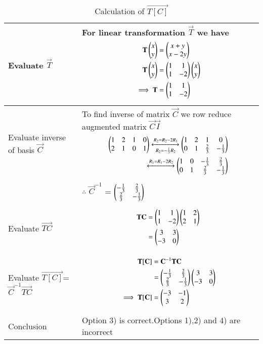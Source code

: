 \documentclass[journal,12pt,twocolumn]{IEEEtran}
\begin{document}
\begin{table}[h!]
\begin{center}
\begin{tabular}{|m{2.2cm}|m{6.3cm}|}\hline
        Evaluate $\vec{T}$ & For linear transformation $\vec{T}$ we have {\begin{align*}
            \mathbf{T}\begin{pmatrix}x\\y\end{pmatrix} &= \begin{pmatrix}x+y\\x-2y\end{pmatrix}\\
            \mathbf{T}\begin{pmatrix}x\\y\end{pmatrix} &= \begin{pmatrix}1&1\\1&-2\end{pmatrix}\begin{pmatrix}x\\y\end{pmatrix}\\
            \implies\mathbf{T} &= \begin{pmatrix}1&1\\1&-2\end{pmatrix}
        \end{align*}} \\
        \hline
        Evaluate inverse of basis $\vec{C}$ & To find inverse of matrix $\vec{C}$ we row reduce augmented matrix $\vec{C}$$\vec{I}$ {\begin{align*}
            \begin{pmatrix}1&2&1&0\\2&1&0&1\end{pmatrix}\xleftrightarrow[R_2=-\frac{1}{3}R_2]{R_2=R_2-2R_1}\begin{pmatrix}1&2&1&0\\0&1&\frac{2}{3}&-\frac{1}{3}\end{pmatrix}\\
            \xleftrightarrow{R_1=R_1-2R_2}\begin{pmatrix}1&0&-\frac{1}{3}&\frac{2}{3}\\0&1&\frac{2}{3}&-\frac{1}{3}\end{pmatrix}
        \end{align*}}\\
        &$\therefore$ $\vec{C}^{-1}$ = $\begin{pmatrix}-\frac{1}{3}&\frac{2}{3}\\\frac{2}{3}&-\frac{1}{3}\end{pmatrix}$ \\
        \hline
        Evaluate $\vec{TC}$ & {\begin{align*}
            \mathbf{TC} &= \begin{pmatrix}1&1\\1&-2\end{pmatrix}\begin{pmatrix}1&2\\2&1\end{pmatrix}\\
            &= \begin{pmatrix}3&3\\-3&0\end{pmatrix}
        \end{align*}}\\
        \hline
        Evaluate $\vec{T[C]}$=$\vec{C}^{-1}\vec{TC}$& {\begin{align*}
            \mathbf{T[C]} &= \mathbf{C}^{-1}\mathbf{TC}\\
            &=\begin{pmatrix}-\frac{1}{3}&\frac{2}{3}\\\frac{2}{3}&-\frac{1}{3}\end{pmatrix}\begin{pmatrix}3&3\\-3&0\end{pmatrix}\\
            \implies \mathbf{T[C]} &= \begin{pmatrix}-3&-1\\3&2\end{pmatrix}
        \end{align*}} \\
        \hline
        Conclusion&Option 3) is correct.Options 1),2) and 4) are incorrect\\
        \hline
    \end{tabular}
    \end{center}
    \caption{Calculation of $\vec{T[C]}$}
    \label{tab:my_label}
\end{table}
\end{document}
